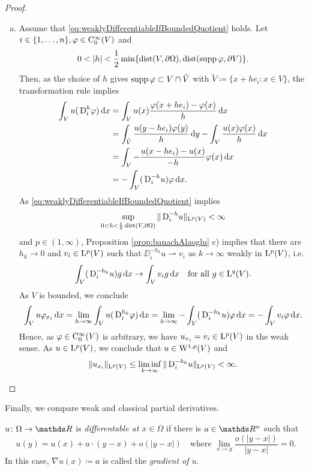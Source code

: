 \begin{proof}
\begin{enumerate}[a)]
    \item Assume that \eqref{eq:weaklyDifferentiableIfBoundedQuotient} holds.
      Let $i \in \{1,\dots,n\}, \varphi \in \mathrm{C}_0^\infty(V)$ and 
      $$
      0 < |h| < \frac{1}{2} \min\{ \operatorname{dist}(V,\partial\Omega), \operatorname{dist}(\operatorname{supp} \varphi, \partial V)\}.$$
      Then, as the choice of $h$ gives $\operatorname{supp} \varphi \subset V \cap \tilde V$ with $\tilde V \coloneqq \{ x + he_i \colon x \in V \}$, the transformation rule implies
      \begin{align*}
        \int_V u(\,{\operatorname{D}}_i^h \varphi)\, {\operatorname{d}\!{x}}
        &= \int_V u(x) \frac{\varphi(x + he_i) - \varphi(x)}{h} \, {\operatorname{d}\!{x}} \\
        &= \int_{\tilde V} \frac{u(y - h e_i)\varphi(y)}{h} \, {\operatorname{d}\!{y}} - \int_V \frac{u(x) \varphi(x)}{h} \, {\operatorname{d}\!{x}} \\
        &= \int_V - \frac{u(x - he_i) - u(x)}{-h} \varphi(x) \, {\operatorname{d}\!{x}} \\
        &= - \int_V (\,{\operatorname{D}}_i^{-h} u) \varphi \, {\operatorname{d}\!{x}}.
      \end{align*}
      As \eqref{eq:weaklyDifferentiableIfBoundedQuotient} implies
      $$
      \sup_{0 < h < \frac{1}{2} \operatorname{dist}(V, \partial\Omega)} \|\,{\operatorname{D}}_i^{-h} u\|_{\mathrm{L}^p(V)} < \infty
      $$
      and $p \in (1,\infty)$, Proposition \ref{prop:banachAlaoglu} c) implies that there are $h_k \to 0$ and $v_i \in \mathrm{L}^p(V)$ such that $\DD_i^{-h_k} u \rightharpoonup v_i$ as $k \to \infty$ weakly in $\mathrm{L}^p(V)$, i.e.
      \begin{equation}
        \label{eq:weakConvergenceInLp}
        \int_V (\,{\operatorname{D}}_i^{-h_k} u) g \, {\operatorname{d}\!{x}} \to \int_V v_i g \, {\operatorname{d}\!{x}} \quad\text{for all } g \in \mathrm{L}^q(V).
      \end{equation}
      As $V$ is bounded, we conclude
      $$
        \int_V u \varphi_{x_i} \, {\operatorname{d}\!{x}}
        = \lim_{h \to \infty} \int_V u( \,{\operatorname{D}}_i^{h_k} \varphi ) \, {\operatorname{d}\!{x}}
        = \lim_{k \to \infty} - \int_V ( \,{\operatorname{D}}_i^{-h_k} u) \varphi \, {\operatorname{d}\!{x}}
        = - \int_V v_i \varphi \, {\operatorname{d}\!{x}}.
      $$
      Hence, as $\varphi \in \mathrm{C}_0^\infty(V)$ is arbitrary, we have $u_{x_i} = v_i \in \mathrm{L}^p(V)$ in the weak sense.
      As $u \in \mathrm{L}^p(V)$, we conclude that $u \in \mathrm{W}^{1,p}(V)$ and
      \[
      \|u_{x_i}\|_{\mathrm{L}^p(V)} \leq \liminf_{k \to \infty} \|\,{\operatorname{D}}_i^{-h_k} u \|_{\mathrm{L}^p(V)} < \infty. \qedhere
    \]
  \end{enumerate}
\end{proof}

Finally, we compare weak and classical partial derivatives.

\begin{defn}
  $u \colon \Omega \to \R$ is \emph{differentable at $x \in \Omega$} if there is $a \in \R^n$ such that 
  $$
  u(y) = u(x) + a \cdot (y - x) + o(|y - x|) \quad\text{where } \lim_{x \to y} \frac{o(|y - x|)}{|y - x|} = 0.
  $$
  In this case, $\nabla u(x) \coloneqq a$ is called the \emph{gradient of $u$}.
\end{defn}

